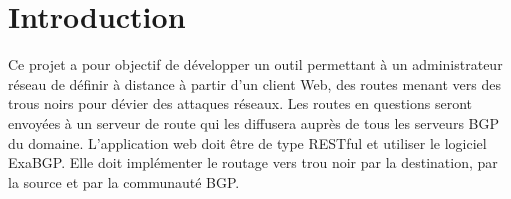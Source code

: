 \chapter{Introduction}


Ce projet a pour objectif de développer un outil permettant à un administrateur réseau de définir à distance à partir d'un client Web, des routes menant vers des trous noirs pour dévier des attaques réseaux. Les routes en questions seront envoyées à un serveur de route qui les diffusera auprès de tous les serveurs BGP du domaine. L'application web doit être de type RESTful et utiliser le logiciel ExaBGP. Elle doit implémenter le routage vers trou noir par la destination, par la source et par la communauté BGP.

